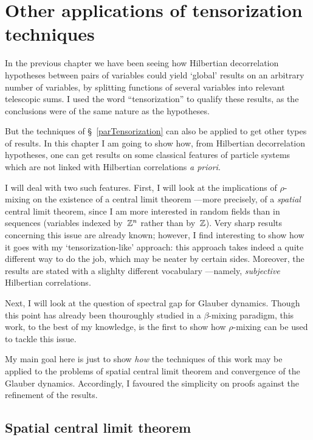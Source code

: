 \chapter{Other applications of tensorization techniques}%
\label{parOtherApplicationsOfTensorizationTechniques}%

In the previous chapter we have been seeing
how Hilbertian decorrelation hypotheses between pairs of variables
could yield `global' results on an arbitrary number of variables,
by splitting functions of several variables into relevant telescopic sums.
I used the word ``tensorization'' to qualify these results,
as the conclusions were of the same nature as the hypotheses.

But the techniques of \S~\ref{parTensorization} can also be applied to get other types of results.
In this chapter I am going to show how, from Hilbertian decorrelation hypotheses,
one can get results on some classical features of particle systems
which are not linked with Hilbertian correlations \emph{a priori}.

I will deal with two such features.
First, I will look at the implications of $\rho$-mixing
on the existence of a central limit theorem%
—more precisely, of a \emph{spatial} central limit theorem,
since I am more interested in random fields than in sequences
(variables indexed by~$\mathbb{Z}^n$ rather than by~$\mathbb{Z}$).
Very sharp results concerning this issue are already known;
however, I find interesting to show how it goes with my `tensorization-like' approach:
this approach takes indeed a quite different way to do the job,
which may be neater by certain sides.
Moreover, the results are stated with a slighlty different vocabulary%
—namely, \emph{subjective} Hilbertian correlations.

Next, I will look at the question of spectral gap for Glauber dynamics.
Though this point has already been thouroughly studied in a $\beta$-mixing paradigm,
this work, to the best of my knowledge,
is the first to show how $\rho$-mixing can be used to tackle this issue.

My main goal here is just to show
\emph{how} the techniques of this work may be applied to the problems
of spatial central limit theorem and convergence of the Glauber dynamics.
Accordingly, I favoured the simplicity on proofs against the refinement of the results.



\section{Spatial central limit theorem}

